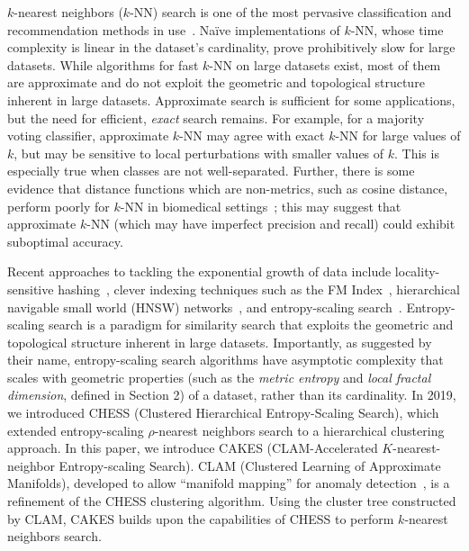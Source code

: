 $k$-nearest neighbors ($k$-NN) search is one of the most pervasive classification and recommendation methods in use~\cite{fix1952discriminatory, cover1967nearest}. 
Na\"{i}ve implementations of $k$-NN, whose time complexity is linear in the dataset's cardinality, prove prohibitively slow for large datasets. %
While algorithms for fast $k$-NN on large datasets exist, most of them are approximate and do not exploit the geometric and topological structure inherent in large datasets.
Approximate search is sufficient for some applications, but the need for efficient, \emph{exact} search remains.
For example, for a majority voting classifier, approximate $k$-NN may agree with exact $k$-NN for large values of $k$, but may be sensitive to local perturbations with smaller values of $k$.
This is especially true when classes are not well-separated. %
Further, there is some evidence that distance functions which are non-metrics, such as cosine distance, perform poorly for $k$-NN in biomedical settings~\cite{hu2016distance};
this may suggest that approximate $k$-NN (which may have imperfect precision and recall) could exhibit suboptimal accuracy.

Recent approaches to tackling the exponential growth of data include locality-sensitive hashing~\cite{indyk1999sublinear}, clever indexing techniques such as the FM Index~\cite{simpson2010efficient}, hierarchical navigable small world (HNSW) networks~\cite{Malkov2016EfficientAR}, and entropy-scaling search~\cite{yu2015entropy, ishaq2019clustered}.
Entropy-scaling search is a paradigm for similarity search that exploits the geometric and topological structure inherent in large datasets.
Importantly, as suggested by their name, entropy-scaling search algorithms have asymptotic complexity that scales with geometric properties (such as the \emph{metric entropy} and \emph{local fractal dimension}, defined in Section 2) of a dataset, rather than its cardinality.
In 2019, we introduced CHESS (Clustered Hierarchical Entropy-Scaling Search), which extended entropy-scaling $\rho$-nearest neighbors search to a hierarchical clustering approach.
In this paper, we introduce CAKES (CLAM-Accelerated $K$-nearest-neighbor Entropy-scaling Search).
CLAM (Clustered Learning of Approximate Manifolds), developed to allow ``manifold mapping'' for anomaly detection~\cite{ishaq2021clustered}, is a refinement of the CHESS clustering algorithm. 
Using the cluster tree constructed by CLAM, CAKES builds upon the capabilities of CHESS to perform $k$-nearest neighbors search.


